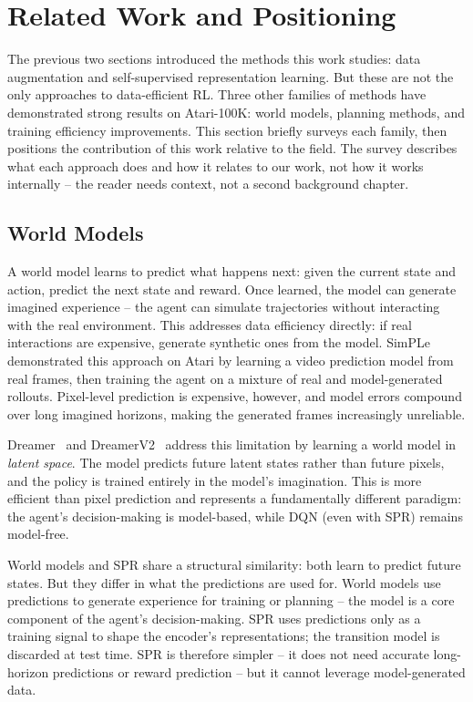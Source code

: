 \section{Related Work and Positioning}
\label{sec:related-work}

The previous two sections introduced the methods this work studies:
data augmentation and self-supervised representation learning. But
these are not the only approaches to data-efficient RL. Three other
families of methods have demonstrated strong results on Atari-100K:
world models, planning methods, and training efficiency
improvements. This section briefly surveys each family, then
positions the contribution of this work relative to the field. The
survey describes what each approach does and how it relates to our
work, not how it works internally -- the reader needs context, not
a second background chapter.

\subsection{World Models}
\label{subsec:world-models}

A world model learns to predict what happens next: given the
current state and action, predict the next state and reward. Once
learned, the model can generate imagined experience -- the agent
can simulate trajectories without interacting with the real
environment. This addresses data efficiency directly: if real
interactions are expensive, generate synthetic ones from the model.
SimPLe~\citep{kaiser2020model} demonstrated this approach on Atari
by learning a video prediction model from real frames, then
training the agent on a mixture of real and model-generated
rollouts. Pixel-level prediction is expensive, however, and model
errors compound over long imagined horizons, making the generated
frames increasingly unreliable.

\smallskip
Dreamer~\citep{hafner2020dream} and
DreamerV2~\citep{hafner2021mastering} address this limitation by
learning a world model in \emph{latent space}. The model predicts
future latent states rather than future pixels, and the policy is
trained entirely in the model's imagination. This is more efficient
than pixel prediction and represents a fundamentally different
paradigm: the agent's decision-making is model-based, while DQN
(even with SPR) remains model-free.

\smallskip
World models and SPR share a structural similarity: both learn to
predict future states. But they differ in what the predictions are
used for. World models use predictions to generate experience for
training or planning -- the model is a core component of the
agent's decision-making. SPR uses predictions only as a training
signal to shape the encoder's representations; the transition model
is discarded at test time. SPR is therefore simpler -- it does not
need accurate long-horizon predictions or reward prediction -- but
it cannot leverage model-generated data.

